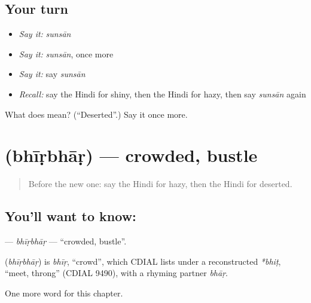 \subsection*{Your turn}
\begin{itemize}
\raggedright
  \item \emph{Say it:} \emph{sunsān}
  \item \emph{Say it:} \emph{sunsān}, once more
  \item \emph{Say it:} say \emph{sunsān}
  \item \emph{Recall:} say the Hindi for shiny, then the Hindi for hazy, then say \emph{sunsān} again
\end{itemize}

\begin{tcolorbox}[breakable,colback=teal!4,colframe=teal!35!black,title={Before you move on}]
What does  mean? (\textquotedblleft{}Deserted\textquotedblright{}.) Say it once more.
\end{tcolorbox}
\section[\texorpdfstring{\hi{भीड़भाड़} (bhīṛbhāṛ)}{भीड़भाड़ (bhīṛbhāṛ)}]{ (bhīṛbhāṛ) — crowded, bustle}

\label{lesson:HI-C239-bhirbhar}



\begin{quote}
Before the new one: say the Hindi for hazy, then the Hindi for deserted.
\end{quote}

\subsection*{You'll want to know: }
\textbf{} — \emph{bhīṛbhāṛ} — \textquotedblleft{}crowded, bustle\textquotedblright{}.

\begin{cousinweb}
\textbf{} (\emph{bhīṛbhāṛ}) is \emph{bhīṛ}, \textquotedblleft{}crowd\textquotedblright{}, which CDIAL lists under a reconstructed \emph{*bhiṭ}, \textquotedblleft{}meet, throng\textquotedblright{} (CDIAL 9490), with a rhyming partner \emph{bhāṛ}.
\end{cousinweb}

\begin{grammarlens}[title={What you've built}]
One more word for this chapter.
\end{grammarlens}

